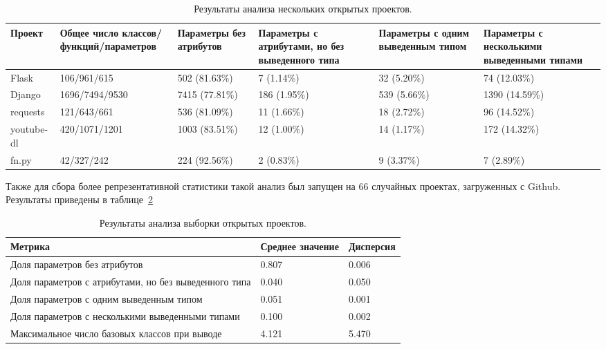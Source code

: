\begin{table}[H]
  \scriptsize
  \caption{Результаты анализа нескольких открытых проектов.}
  \label{tab:statistic-results-1}
  \begin{tabularx}{\textwidth}{ |X|X|X|X|X|X| }
    \hline
    Проект & Общее число классов/функций/параметров & Параметры без атрибутов &
    Параметры с атрибутами, но без выведенного типа & 
    Параметры с одним выведенным типом & 
    Параметры с несколькими выведенными типами \\ \hline

    Flask & 106/961/615 & 502 (81.63\%) & 7 (1.14\%) & 32 (5.20\%) & 74 (12.03\%)
    \\ \hline

    Django & 1696/7494/9530 & 7415 (77.81\%) & 186 (1.95\%) & 539 (5.66\%) &
    1390 (14.59\%)
    \\ \hline

    requests & 121/643/661 & 536 (81.09\%) & 11 (1.66\%) & 18 (2.72\%) & 96
    (14.52\%)
    \\ \hline

    youtube-dl & 420/1071/1201 & 1003 (83.51\%) & 12 (1.00\%) & 14 (1.17\%)
    & 172 (14.32\%)
    \\ \hline

    fn.py & 42/327/242 &  224 (92.56\%) & 2 (0.83\%) & 9 (3.37\%) & 7
    (2.89\%)
    \\ \hline

  \end{tabularx}
\end{table}

Также для сбора более репрезентативной статистики такой анализ был запущен на 66
случайных проектах, загруженных с Github. Результаты приведены в
таблице~\ref{tab:statistics-results-2}

\begin{table}[H]
  \scriptsize
  \caption{Результаты анализа выборки открытых проектов.}
  \label{tab:statistics-results-2}
  \begin{tabularx}{\textwidth}{ |X|X|X| }
    \hline
    Метрика & Среднее значение & Дисперсия \\ \hline
    Доля параметров без атрибутов & 0.807 & 0.006 \\ \hline
    Доля параметров с атрибутами, но без выведенного типа & 0.040 & 0.050 \\ \hline
    Доля параметров с одним выведенным типом & 0.051 & 0.001 \\ \hline
    Доля параметров с несколькими выведенными типами & 0.100 & 0.002 \\ \hline
    Максимальное число базовых классов при выводе & 4.121 & 5.470 \\ \hline
  \end{tabularx}
\end{table}

